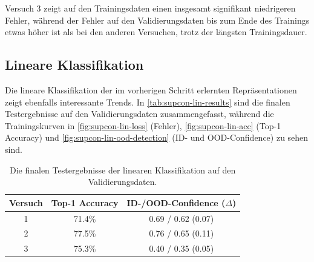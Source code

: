 Versuch 3 zeigt auf den Trainingsdaten einen insgesamt signifikant niedrigeren Fehler, während der Fehler auf den Validierungsdaten bis zum Ende des Trainings etwas höher ist als bei den anderen Versuchen, trotz der längsten Trainingsdauer.

\subsection{Lineare Klassifikation} \label{subsec:supcon-lin-results}

Die lineare Klassifikation der im vorherigen Schritt erlernten Repräsentationen zeigt ebenfalls interessante Trends. In \autoref{tab:supcon-lin-results} sind die finalen Testergebnisse auf den Validierungsdaten zusammengefasst, während die Trainingskurven in \autoref{fig:supcon-lin-loss} (Fehler), \autoref{fig:supcon-lin-acc} (Top-1 Accuracy) und \autoref{fig:supcon-lin-ood-detection} (ID- und OOD-Confidence) zu sehen sind.

\begin{table}[h]
	\caption{Die finalen Testergebnisse der linearen Klassifikation auf den Validierungsdaten.}
	\begin{tabular}{|c|c|c|}
		\hline
		\textbf{Versuch} & \textbf{Top-1 Accuracy} & \textbf{ID-/OOD-Confidence ($\Delta$)} \\
		\hline
		1 & 71.4\% & 0.69 / 0.62 (0.07) \\
		2 & 77.5\% & 0.76 / 0.65 (0.11) \\
		3 & 75.3\% & 0.40 / 0.35 (0.05) \\
		\hline
	\end{tabular}
	\label{tab:supcon-lin-results}
\end{table}

\newpage

